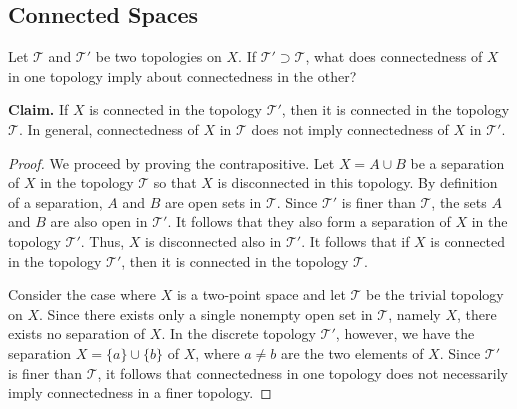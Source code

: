 \subsection{Connected Spaces}

\begin{exercise}[ID=3.23.1]
  Let $\mathcal{T}$ and $\mathcal{T}'$ be two topologies on $X$.
  If $\mathcal{T}' \supset \mathcal{T}$, what does connectedness of $X$ in one topology imply about connectedness in the other?
\end{exercise}
%
\begin{solution}
  \textbf{Claim.} If $X$ is connected in the topology $\mathcal{T'}$, then it is connected in the topology $\mathcal{T}$.
  In general, connectedness of $X$ in $\mathcal{T}$ does not imply connectedness of $X$ in $\mathcal{T}'$.
  \begin{proof}
    We proceed by proving the contrapositive.
    Let $X = A \cup B$ be a separation of $X$ in the topology $\mathcal{T}$ so that $X$ is disconnected in this topology.
    By definition of a separation, $A$ and $B$ are open sets in $\mathcal{T}$.
    Since $\mathcal{T}'$ is finer than $\mathcal{T}$, the sets $A$ and $B$ are also open in $\mathcal{T}'$.
    It follows that they also form a separation of $X$ in the topology $\mathcal{T}'$.
    Thus, $X$ is disconnected also in $\mathcal{T}'$.
    It follows that if $X$ is connected in the topology $\mathcal{T'}$, then it is connected in the topology $\mathcal{T}$.

    Consider the case where $X$ is a two-point space and let $\mathcal{T}$ be the trivial topology on $X$.
    Since there exists only a single nonempty open set in $\mathcal{T}$, namely $X$, there exists no separation of $X$.
    In the discrete topology $\mathcal{T}'$, however, we have the separation $X = \{a\} \cup \{b\}$ of $X$, where $a \neq b$ are the two elements of $X$.
    Since $\mathcal{T}'$ is finer than $\mathcal{T}$, it follows that connectedness in one topology does not necessarily imply connectedness in a finer topology.
  \end{proof}
\end{solution}
\newpage

